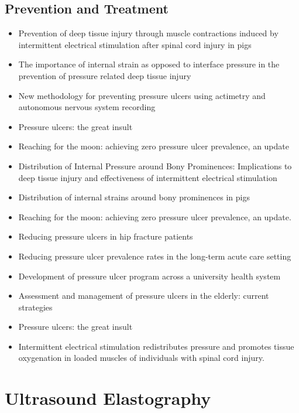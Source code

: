 		\subsection{Prevention and Treatment}
			\begin{itemize}
				\item Prevention of deep tissue injury through muscle contractions induced by intermittent electrical stimulation after spinal cord injury in pigs \cite{solis13}
				\item The importance of internal strain as opposed to interface pressure in the prevention of pressure related deep tissue injury \cite{oomens10}
				\item New methodology for preventing pressure ulcers using actimetry and autonomous nervous system recording \cite{meffre06}
				\item Pressure ulcers: the great insult \cite{maklebust05}
				\item Reaching for the moon: achieving zero pressure ulcer prevalence, an update \cite{bales11}
				\item Distribution of Internal Pressure around Bony Prominences: Implications to deep tissue injury and effectiveness of intermittent electrical stimulation \cite{solis12-02}
				\item Distribution of internal strains around bony prominences in pigs \cite{solid12-03}
				\item Reaching for the moon: achieving zero pressure ulcer prevalence, an update. \cite{bales11}
				\item Reducing pressure ulcers in hip fracture patients \cite{thompson11}
				\item Reducing pressure ulcer prevalence rates in the long-term acute care setting \cite{milne09}
				\item Development of pressure ulcer program across a university health system \cite{carson11}
				\item Assessment and management of pressure ulcers in the elderly: current strategies \cite{jaul10}
				\item Pressure ulcers: the great insult \cite{maklebust05}
				\item Intermittent electrical stimulation redistributes pressure and promotes tissue oxygenation in loaded muscles of individuals with spinal cord injury. \cite{gyawali11}
			\end{itemize}

	\section{Ultrasound Elastography}
		\lipsum[1]

